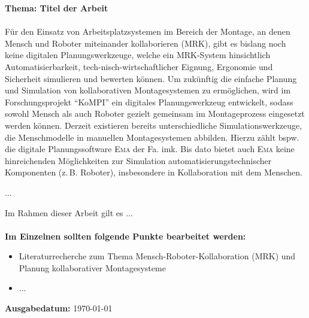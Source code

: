 

\textbf{Thema: Titel der Arbeit}
\\
\\
\noindent
Für den Einsatz von Arbeitsplatzsystemen im Bereich der Montage, an denen Mensch und Roboter miteinander kollaborieren (MRK), gibt es bislang noch keine digitalen Planungswerkzeuge, welche ein MRK-System hinsichtlich Automatisierbarkeit, tech-nisch-wirtschaftlicher Eignung, Ergonomie und Sicherheit simulieren und bewerten können.
Um zukünftig die einfache Planung und Simulation von kollaborativen Montagesystemen zu ermöglichen, wird im Forschungsprojekt "`KoMPI"' ein digitales Planungswerkzeug entwickelt, sodass sowohl Mensch als auch Roboter gezielt gemeinsam im Montageprozess eingesetzt werden können. 
Derzeit existieren bereits unterschiedliche Simulationswerkzeuge, die Menschmodelle in manuellen Montagesystemen abbilden.
Hierzu zählt bspw. die digitale Planungssoftware \textsc{Ema} der Fa. imk.
Bis dato bietet auch \textsc{Ema} keine hinreichenden Möglichkeiten zur Simulation automatisierungstechnischer Komponenten (z.\,B. Roboter), insbesondere in Kollaboration mit dem Menschen.

...

Im Rahmen dieser Arbeit gilt es ...
\\
\\
\noindent
\textbf{Im Einzelnen sollten folgende Punkte bearbeitet werden:}
\begin{itemize}
	\item Literaturrecherche zum Thema Mensch-Roboter-Kollaboration (MRK) und Planung kollaborativer Montagesysteme
	\item ...
\end{itemize}

\noindent
\textbf{Ausgabedatum:} \today \\
